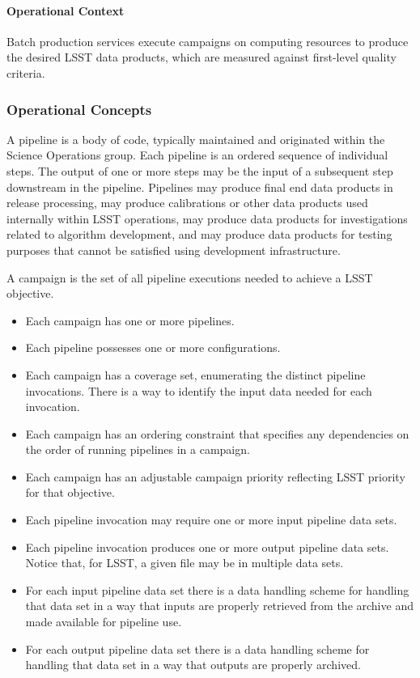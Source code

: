 \paragraph{Operational Context}
Batch production services execute campaigns on computing resources to produce
the desired LSST data products, which are measured against first-level quality
criteria.

\subsubsection{Operational Concepts}
A pipeline is a body of code, typically maintained and originated within the
Science Operations group. Each pipeline is an ordered sequence of individual
steps. The output of one or more steps may be the input of a subsequent step
downstream in the pipeline. Pipelines may produce final end data products in
release processing, may produce calibrations or other data products used
internally within LSST operations, may produce data products for investigations
related to algorithm development, and may produce data products for testing
purposes that cannot be satisfied using development infrastructure.

A campaign is the set of all pipeline executions needed to achieve a LSST
objective.

\begin{itemize}

\item Each campaign has one or more pipelines.

\item Each pipeline possesses one or more configurations.

\item Each campaign has a coverage set, enumerating the distinct pipeline
invocations. There is a way to identify the input data needed for each
invocation.

\item Each campaign has an ordering constraint that specifies any dependencies
on the order of running pipelines in a campaign.

\item Each campaign has an adjustable campaign priority reflecting LSST priority
for that objective.

\item Each pipeline invocation may require one or more input pipeline data sets.

\item Each pipeline invocation produces one or more output pipeline data sets.
Notice that, for LSST, a given file may be in multiple data sets.

\item For each input pipeline data set there is a data handling scheme for
handling that data set in a
way that inputs are properly retrieved from the archive and made available for
pipeline use.

\item For each output pipeline data set there is a data handling scheme for
handling that data set in a way that outputs are properly archived.

\end{itemize}

